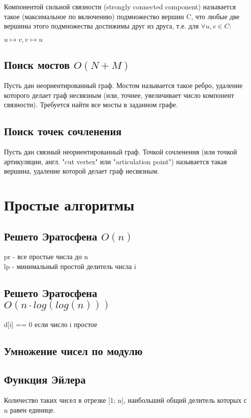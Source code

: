 \documentclass[a4paper]{article}
\begin{document}
\begin{multicols*}{2}
		Компонентой сильной связности (strongly connected component) называется такое (максимальное по включению) подмножество вершин C, что любые две вершины этого подмножества достижимы друг из друга, т.е. для $\forall u,v \in C:$
		
		$u \mapsto v, v \mapsto u $
		
		\subsection{Поиск мостов $O(N+M)$}
		Пусть дан неориентированный граф. Мостом называется такое ребро, удаление которого делает граф несвязным (или, точнее, увеличивает число компонент связности). Требуется найти все мосты в заданном графе.		
		
		\subsection{Поиск точек сочленения}
		Пусть дан связный неориентированный граф. Точкой сочленения (или точкой артикуляции, англ. "cut vertex" или "articulation point") называется такая вершина, удаление которой делает граф несвязным.
		
		
		\section{Простые алгоритмы}		
		\subsection{Решето Эратосфена $O(n)$}
		pr - все простые числа до n \\
		lp - минимальный простой делитель числа i
		 
		

		\subsection{Решето Эратосфена \\ $O(n \cdot log(log(n)))$}
		d[i] == 0 если число i простое
		
		\subsection{Умножение чисел по модулю}
		
		\subsection{Функция Эйлера}
		Количество таких чисел в отрезке [1; n], наибольший общий делитель которых с n равен единице.
		

\end{multicols*}
\end{document}
